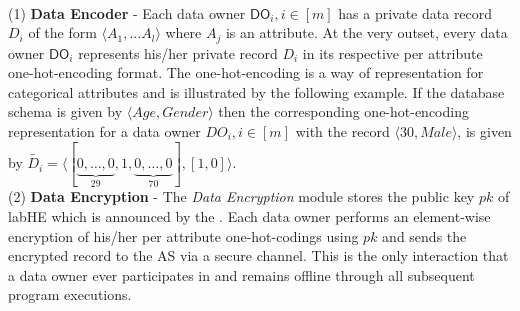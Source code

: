 \\
(1)\textbf{ Data Encoder} -  Each data owner $\textsf{DO}_i, i \in [m]$ has a private data record $D_i$ of the form $\langle A_1,...A_l\rangle$ where ${A}_j$ is an attribute. At the very outset, every data owner  $\textsf{DO}_i$ represents his/her private record $D_i$ in its respective per attribute one-hot-encoding format. The one-hot-encoding is a way of representation for categorical attributes and is illustrated by the following example. 
If the database schema is given by  $\langle Age,Gender\rangle$ then the corresponding one-hot-encoding representation for a data owner $DO_i, i \in [m]$ with the record $\langle 30, Male\rangle$, is given by $\tilde{D_i}=\langle[\underbrace{0,\ldots,0}_{29},1,\underbrace{0,\ldots,0}_{70}],[1,0]\rangle$. \\
(2)\textbf{ Data Encryption} - The \textit{Data Encryption} module stores the public key $pk$ of \textsf{labHE}  which is announced by the \CSP. Each data owner performs an element-wise encryption of his/her per attribute one-hot-codings using $pk$ and sends the encrypted record to the \textsf{AS} via a secure channel. 
 This is the only interaction that a data owner ever participates in and remains offline through all subsequent program executions.


